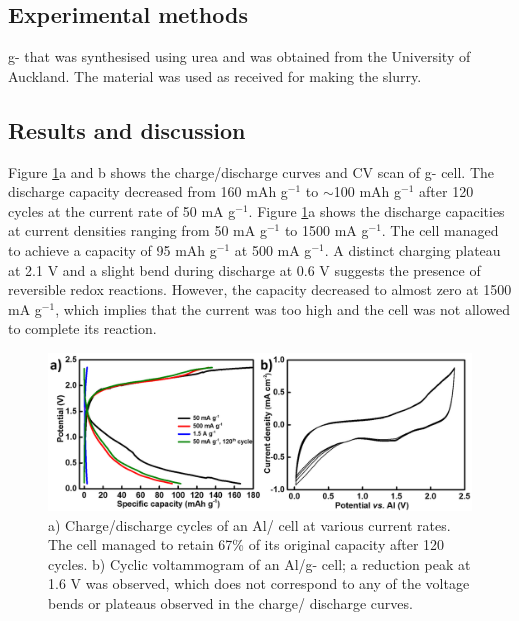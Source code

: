 \subsection{Experimental methods}
g- that was synthesised using urea and was obtained from the University of Auckland. The material was used as received for making the slurry. 

\subsection{Results and discussion}
Figure \ref{Figures/chap6fig:CNUcdccv}a and b shows the charge/discharge curves and CV scan of g- cell. The discharge capacity decreased from 160 mAh g$^{-1}$ to $\sim$100 mAh g$^{-1}$ after 120 cycles at the current rate of 50 mA g$^{-1}$. Figure \ref{Figures/chap6fig:CNUcdccv}a shows the discharge capacities at current densities ranging from 50 mA g$^{-1}$ to 1500 mA g$^{-1}$. The cell managed to achieve a capacity of 95 mAh g$^{-1}$ at 500 mA g$^{-1}$. A distinct charging plateau at 2.1 V and a slight bend during discharge at 0.6 V suggests the presence of reversible redox reactions. However, the capacity decreased to almost zero at 1500 mA g$^{-1}$, which implies that the current was too high and the cell was not allowed to complete its reaction. 

\begin{figure}[th!]
\centering
\includegraphics[width=\textwidth]{Figures/chap6fig/CNUcdccv}
\caption{a) Charge/discharge cycles of an Al/ cell at various current rates. The cell managed to retain 67\% of its original capacity after 120 cycles. b) Cyclic voltammogram of an Al/g- cell; a reduction peak at 1.6 V was observed, which does not correspond to any of the voltage bends or plateaus observed in the charge/ discharge curves. }
\label{Figures/chap6fig:CNUcdccv}
\end{figure}

